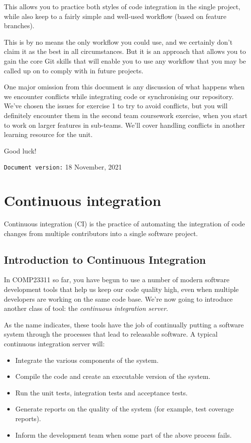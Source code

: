 \documentclass[
]{book}
\providecommand{\tightlist}{%
  \setlength{\itemsep}{0pt}\setlength{\parskip}{0pt}}
\begin{document}
This allows you to practice both styles of code integration in the single project, while also keep to a fairly simple and well-used workflow (based on feature branches).

This is by no means the only workflow you could use, and we certainly don't claim it as the best in all circumstances. But it is an approach that allows you to gain the core Git skills that will enable you to use any workflow that you may be called up on to comply with in future projects.

One major omission from this document is any discussion of what happens when we encounter conflicts while integrating code or synchronising our repository. We've chosen the issues for exercise 1 to try to avoid conflicts, but you will definitely encounter them in the second team coursework exercise, when you start to work on larger features in sub-teams. We'll cover handling conflicts in another learning resource for the unit.

Good luck!

\texttt{Document\ version:} 18 November, 2021

\hypertarget{integrating}{%
\chapter{Continuous integration}\label{integrating}}

Continuous integration (CI) is the practice of automating the integration of code changes from multiple contributors into a single software project.

\hypertarget{ici}{%
\section{Introduction to Continuous Integration}\label{ici}}

In COMP23311 so far, you have begun to use a number of modern software development tools that help us keep our code quality high, even when multiple developers are working on the same code base. We're now going to introduce another class of tool: the \emph{continuous integration server}.

As the name indicates, these tools have the job of continually putting a software system through the processes that lead to releasable software. A typical continuous integration server will:

\begin{itemize}
\tightlist
\item
  Integrate the various components of the system.
\item
  Compile the code and create an executable version of the system.
\item
  Run the unit tests, integration tests and acceptance tests.
\item
  Generate reports on the quality of the system (for example, test coverage reports).
\item
  Inform the development team when some part of the above process fails.
\end{itemize}
\end{document}
